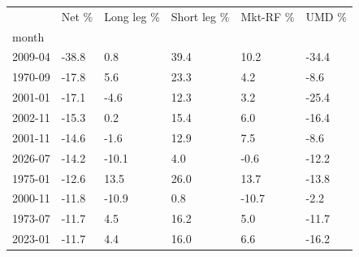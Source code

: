 \begin{tabular}{llllll}
\toprule
 & Net \% & Long leg \% & Short leg \% & Mkt-RF \% & UMD \% \\
month &  &  &  &  &  \\
\midrule
2009-04 & -38.8 & 0.8 & 39.4 & 10.2 & -34.4 \\
1970-09 & -17.8 & 5.6 & 23.3 & 4.2 & -8.6 \\
2001-01 & -17.1 & -4.6 & 12.3 & 3.2 & -25.4 \\
2002-11 & -15.3 & 0.2 & 15.4 & 6.0 & -16.4 \\
2001-11 & -14.6 & -1.6 & 12.9 & 7.5 & -8.6 \\
2026-07 & -14.2 & -10.1 & 4.0 & -0.6 & -12.2 \\
1975-01 & -12.6 & 13.5 & 26.0 & 13.7 & -13.8 \\
2000-11 & -11.8 & -10.9 & 0.8 & -10.7 & -2.2 \\
1973-07 & -11.7 & 4.5 & 16.2 & 5.0 & -11.7 \\
2023-01 & -11.7 & 4.4 & 16.0 & 6.6 & -16.2 \\
\bottomrule
\end{tabular}
